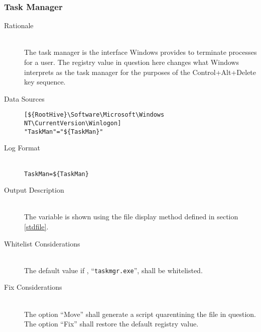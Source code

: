 \subsubsection{Task Manager}
\begin{description}
\item[Rationale] \hfill \\
The task manager is the interface Windows provides to terminate processes for a
user. The registry value in question here changes what Windows interprets as the
task manager for the purposes of the Control+Alt+Delete key sequence.
\item[Data Sources] \hfill
\vspace{-\baselineskip}
\begin{verbatim}
[${RootHive}\Software\Microsoft\Windows NT\CurrentVersion\Winlogon]
"TaskMan"="${TaskMan}"
\end{verbatim}
\item[Log Format] \hfill \\
\verb|TaskMan=${TaskMan}|
\item[Output Description] \hfill \\
The variable  is shown using the file display method defined in
section \ref{stdfile}.
\item[Whitelist Considerations] \hfill \\
The default value if , ``\verb|taskmgr.exe|'', shall be whitelisted.
\item[Fix Considerations] \hfill \\
The option ``Move'' shall generate a script quarentining the file in question.
The option ``Fix'' shall restore the default registry value.
\end{description}

